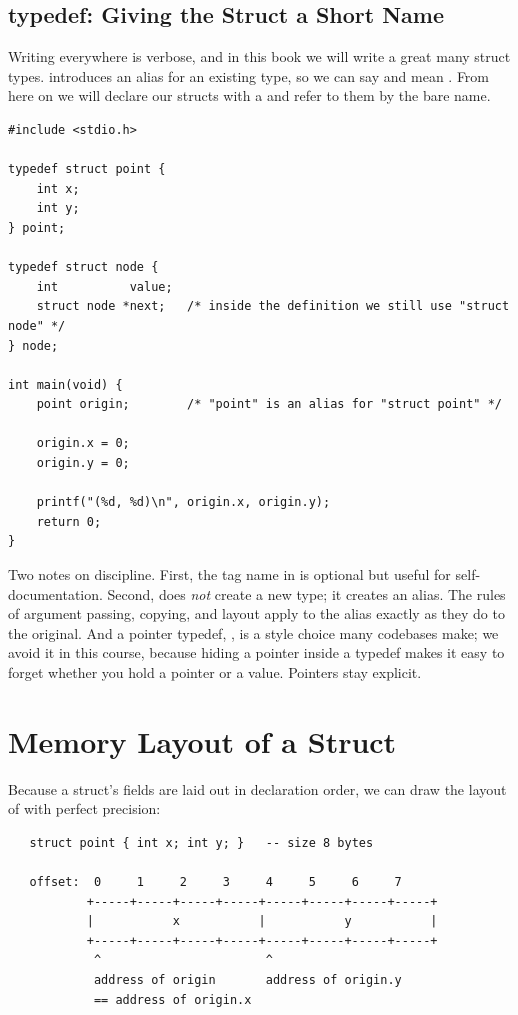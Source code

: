 \subsection{typedef: Giving the Struct a Short Name}

Writing  everywhere is verbose, and in this book we
will write a great many struct types.  introduces an
alias for an existing type, so we can say  and mean
. From here on we will declare our structs with a
 and refer to them by the bare name.

\begin{lstlisting}[caption={A typedef names the struct; a companion pointer typedef follows.}]
#include <stdio.h>

typedef struct point {
    int x;
    int y;
} point;

typedef struct node {
    int          value;
    struct node *next;   /* inside the definition we still use "struct node" */
} node;

int main(void) {
    point origin;        /* "point" is an alias for "struct point" */

    origin.x = 0;
    origin.y = 0;

    printf("(%d, %d)\n", origin.x, origin.y);
    return 0;
}
\end{lstlisting}

Two notes on discipline. First, the tag name  in
 is optional but useful for
self-documentation. Second,  does \emph{not} create a
new type; it creates an alias. The rules of argument passing, copying,
and layout apply to the alias exactly as they do to the original. And a
pointer typedef, , is a style
choice many codebases make; we avoid it in this course, because
hiding a pointer inside a typedef makes it easy to forget whether you
hold a pointer or a value. Pointers stay explicit.

\section{Memory Layout of a Struct}

Because a struct's fields are laid out in declaration order, we can
draw the layout of  with perfect precision:

\begin{verbatim}
   struct point { int x; int y; }   -- size 8 bytes

   offset:  0     1     2     3     4     5     6     7
           +-----+-----+-----+-----+-----+-----+-----+-----+
           |           x           |           y           |
           +-----+-----+-----+-----+-----+-----+-----+-----+
            ^                       ^
            address of origin       address of origin.y
            == address of origin.x
\end{verbatim}

